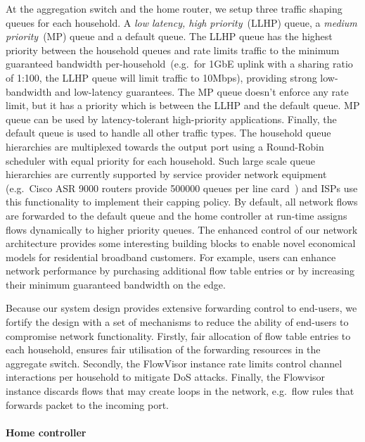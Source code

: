 At the aggregation switch and the home router, we setup three traffic shaping
queues for each household. A \textit{low latency, high priority}~(LLHP) queue, a
\textit{medium priority}~(MP) queue and a default queue.  The LLHP queue has the
highest priority between the household queues and rate limits traffic to the
minimum guaranteed bandwidth per-household~(e.g.~for 1GbE uplink with a sharing
ratio of 1:100, the LLHP queue will limit traffic to 10Mbps), providing strong
low-bandwidth and low-latency guarantees. The MP queue doesn't enforce any rate
limit, but it has a priority which is between the LLHP and the default queue.
MP queue can be used by latency-tolerant high-priority applications.  Finally,
the default queue is used to handle all other traffic types.  The household
queue hierarchies are multiplexed towards the output port using a Round-Robin
scheduler with equal priority for each household. Such large scale queue
hierarchies are currently supported by service provider network equipment
(e.g.~Cisco ASR 9000 routers provide 500000 queues per line
card~) and ISPs use this functionality to implement their
capping policy. By default, all network flows are forwarded to the default queue
and the home \of controller at run-time assigns flows dynamically to higher
priority queues.  The enhanced control of our network architecture
provides some interesting building blocks to enable novel economical models for
residential broadband customers. For example, users can enhance network
performance by purchasing additional flow table entries or by increasing their
minimum guaranteed bandwidth on the edge.

Because our system design provides extensive forwarding control to end-users, we
fortify the design with a set of mechanisms to reduce the ability of end-users
to compromise network functionality.  Firstly, fair allocation of flow table
entries to each household, ensures fair utilisation of the forwarding resources
in the aggregate switch. Secondly, the FlowVisor instance rate limits \of
control channel interactions per household to mitigate DoS attacks. Finally, the
Flowvisor instance discards flows that may create loops in the network,
e.g.~flow rules that forwards packet to the incoming port. 

\paragraph*{Home \of controller}

